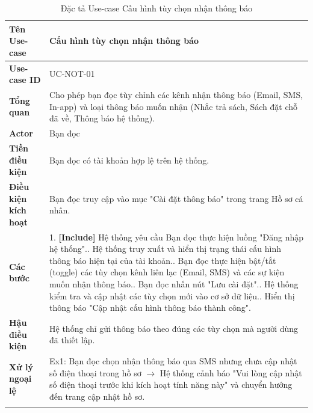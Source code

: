 \begin{longtable}{|p{3.5cm}|p{11.5cm}|}
    \hline
    \textbf{Tên Use-case} & \textbf{Cấu hình tùy chọn nhận thông báo} \\
    \hline
    \textbf{Use-case ID} & UC-NOT-01 \\
    \hline
    \textbf{Tổng quan} & Cho phép bạn đọc tùy chỉnh các kênh nhận thông báo (Email, SMS, In-app) và loại thông báo muốn nhận (Nhắc trả sách, Sách đặt chỗ đã về, Thông báo hệ thống). \\
    \hline
    \textbf{Actor} & Bạn đọc \\
    \hline
    \textbf{Tiền điều kiện} & Bạn đọc có tài khoản hợp lệ trên hệ thống. \\
    \hline
    \textbf{Điều kiện kích hoạt} & Bạn đọc truy cập vào mục "Cài đặt thông báo" trong trang Hồ sơ cá nhân. \\
    \hline
    \textbf{Các bước} & 
    1. \textbf{[Include]} Hệ thống yêu cầu Bạn đọc thực hiện luồng "Đăng nhập hệ thống".\newline
    2. Hệ thống truy xuất và hiển thị trạng thái cấu hình thông báo hiện tại của tài khoản.\newline
    3. Bạn đọc thực hiện bật/tắt (toggle) các tùy chọn kênh liên lạc (Email, SMS) và các sự kiện muốn nhận thông báo.\newline
    4. Bạn đọc nhấn nút "Lưu cài đặt".\newline
    5. Hệ thống kiểm tra và cập nhật các tùy chọn mới vào cơ sở dữ liệu.\newline
    6. Hiển thị thông báo "Cập nhật cấu hình thông báo thành công". \\
    \hline
    \textbf{Hậu điều kiện} & Hệ thống chỉ gửi thông báo theo đúng các tùy chọn mà người dùng đã thiết lập. \\
    \hline
    \textbf{Xử lý ngoại lệ} & 
    Ex1: Bạn đọc chọn nhận thông báo qua SMS nhưng chưa cập nhật số điện thoại trong hồ sơ $\rightarrow$ Hệ thống cảnh báo "Vui lòng cập nhật số điện thoại trước khi kích hoạt tính năng này" và chuyển hướng đến trang cập nhật hồ sơ. \\
    \hline
    \caption{Đặc tả Use-case Cấu hình tùy chọn nhận thông báo}
\end{longtable}

